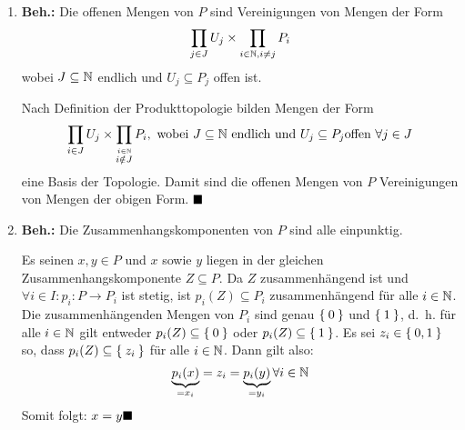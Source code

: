 \begin{solution}[\ref{ub2:aufg4}]
    \begin{enumerate}[label=(\alph*)]
        \item \textbf{Beh.:} Die offenen Mengen von $P$ sind
              Vereinigungen von Mengen der Form 
              \[\prod_{j \in J} U_j \times \prod_{i \in \mathbb{N}, i \neq j} P_i\]
              wobei $J \subseteq \mathbb{N}$ endlich und $U_j \subseteq P_j$
              offen ist.
              \begin{beweis}
                Nach Definition der Produkttopologie bilden Mengen
                der Form
                \[\prod_{i \in J} U_j \times \prod_{\stackrel{i \in \mathbb{N}}{i \notin J}} P_i, \text{ wobei } J \subseteq \mathbb{N} \text{ endlich und } U_j \subseteq P_j \text{offen } \forall{j \in J}\]
                eine Basis der Topologie. Damit sind die offenen 
                Mengen von $P$ Vereinigungen von Mengen der obigen
                Form. $\qed$
              \end{beweis}
        \item \textbf{Beh.:} Die Zusammenhangskomponenten von $P$
              sind alle einpunktig.
              \begin{beweis}
                Es seinen $x,y \in P$ und $x$ sowie $y$ liegen in der
                gleichen Zusammenhangskomponente $Z \subseteq P$.
                Da $Z$ zusammenhängend ist und $\forall{i \in I}: p_i : P \rightarrow P_i$
                ist stetig, ist $p_i(Z) \subseteq P_i$ zusammenhängend
                für alle $i \in \mathbb{N}$. Die zusammenhängenden Mengen
                von $P_i$ sind genau $\Set{0}$ und $\Set{1}$, d.~h.
                für alle $i \in \mathbb{N}$ gilt entweder $p_i(Z) \subseteq \Set{0}$
                oder $p_i(Z) \subseteq \Set{1}$. Es sei $z_i \in \Set{0,1}$
                so, dass $p_i(Z) \subseteq \Set{z_i}$ für alle $i \in \mathbb{N}$.
                Dann gilt also: 
                \[\underbrace{p_i(x)}_{= x_i} = z_i = \underbrace{p_i(y)}_{= y_i} \forall i \in \mathbb{N}\]
                Somit folgt: $x = y \qed$
                
              \end{beweis}
    \end{enumerate}
\end{solution}

